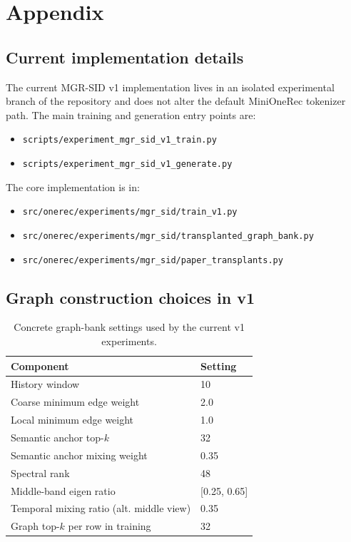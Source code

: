 \section{Appendix}

\subsection{Current implementation details}

The current MGR-SID v1 implementation lives in an isolated experimental branch of the repository and does not alter the default MiniOneRec tokenizer path. The main training and generation entry points are:
\begin{itemize}[leftmargin=1.4em]
  \item \texttt{scripts/experiment\_mgr\_sid\_v1\_train.py}
  \item \texttt{scripts/experiment\_mgr\_sid\_v1\_generate.py}
\end{itemize}

The core implementation is in:
\begin{itemize}[leftmargin=1.4em]
  \item \texttt{src/onerec/experiments/mgr\_sid/train\_v1.py}
  \item \texttt{src/onerec/experiments/mgr\_sid/transplanted\_graph\_bank.py}
  \item \texttt{src/onerec/experiments/mgr\_sid/paper\_transplants.py}
\end{itemize}

\subsection{Graph construction choices in v1}

\begin{table}[h]
  \centering
  \caption{Concrete graph-bank settings used by the current v1 experiments.}
  \label{tab:appendix-graph}
  \begin{tabular}{ll}
    \toprule
    Component & Setting \\
    \midrule
    History window & 10 \\
    Coarse minimum edge weight & 2.0 \\
    Local minimum edge weight & 1.0 \\
    Semantic anchor top-$k$ & 32 \\
    Semantic anchor mixing weight & 0.35 \\
    Spectral rank & 48 \\
    Middle-band eigen ratio & [0.25, 0.65] \\
    Temporal mixing ratio (alt. middle view) & 0.35 \\
    Graph top-$k$ per row in training & 32 \\
    \bottomrule
  \end{tabular}
\end{table}

